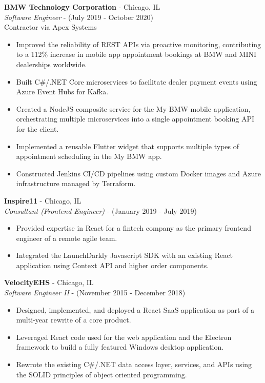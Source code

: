 \documentclass[10pt]{article}
\begin{document}
\begin{paracol}{2}
    \noindent \textbf{BMW Technology Corporation} - Chicago, IL \\
    \textit{Software Engineer} - {\footnotesize{(July 2019 - October 2020)}} \\
    {\footnotesize{Contractor via Apex Systems}}
    \begin{itemize}
        \item Improved the reliability of REST APIs via proactive monitoring, contributing to a 112\% increase in mobile app appointment bookings at BMW and MINI dealerships worldwide.
        \item Built C\#/.NET Core microservices to facilitate dealer payment events using Azure Event Hubs for Kafka.
        \item Created a NodeJS composite service for the My BMW mobile application, orchestrating multiple microservices into a single appointment booking API for the client.
        \item Implemented a reusable Flutter widget that supports multiple types of appointment scheduling in the My BMW app.
        \item Constructed Jenkins CI/CD pipelines using custom Docker images and Azure infrastructure managed by Terraform.
    \end{itemize}


    \noindent \textbf{Inspire11} - Chicago, IL \\
    \textit{Consultant (Frontend Engineer)} - {\footnotesize{(January 2019 - July 2019)}}
    \begin{itemize}
        \item Provided expertise in React for a fintech company as the primary frontend engineer of a remote agile team.
        \item Integrated the LaunchDarkly Javascript SDK with an existing React application using Context API and higher order components.
    \end{itemize}

    \noindent \textbf{VelocityEHS} - Chicago, IL \\
    \textit{Software Engineer II} - {\footnotesize{(November 2015 - December 2018)}}
    \begin{itemize}
        \item Designed, implemented, and deployed a React SaaS application as part of a multi-year rewrite of a core product.
        \item Leveraged React code used for the web application and the Electron framework to build a fully featured Windows desktop application.
        \item Rewrote the existing C\#/.NET data access layer, services, and APIs using the SOLID principles of object oriented programming.
    \end{itemize}


\end{paracol}
\end{document}
